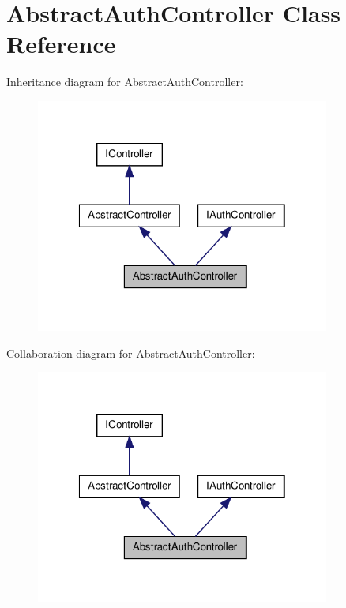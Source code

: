 \hypertarget{class_sec_plus_1_1_abstract_auth_controller}{
\section{AbstractAuthController Class Reference}
\label{class_sec_plus_1_1_abstract_auth_controller}
}


Inheritance diagram for AbstractAuthController:\nopagebreak
\begin{figure}[H]
\begin{center}
\leavevmode
\includegraphics[width=274pt]{class_sec_plus_1_1_abstract_auth_controller__inherit__graph}
\end{center}
\end{figure}


Collaboration diagram for AbstractAuthController:\nopagebreak
\begin{figure}[H]
\begin{center}
\leavevmode
\includegraphics[width=274pt]{class_sec_plus_1_1_abstract_auth_controller__coll__graph}
\end{center}
\end{figure}

